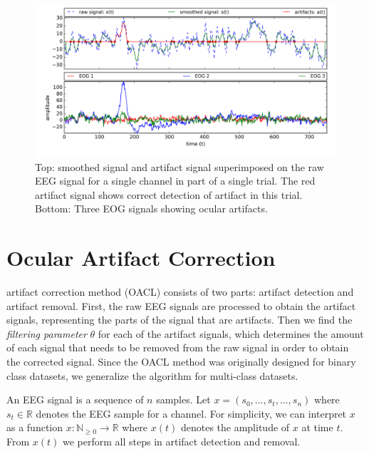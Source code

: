 \begin{figure}%
	\centering
	\includegraphics[width=1\textwidth]{figures/oacl-signals.png}
	\vspace{-2em}
	\caption{Top: smoothed signal and artifact signal superimposed on the raw EEG signal for a single channel in part of a single trial. The red artifact signal shows correct detection of artifact in this trial. Bottom: Three EOG signals showing ocular artifacts.}
	\label{fig:oacl-signals}
\end{figure}
\section{Ocular Artifact Correction}\label{sec:oacl}
\cite{li2015ocular} artifact correction method (OACL) consists of two parts: artifact detection and artifact removal. First, the raw EEG signals are processed to obtain the artifact signals, representing the parts of the signal that are artifacts. Then we find the \emph{filtering parameter} $\theta$ for each of the artifact signals, which determines the amount of each signal that needs to be removed from the raw signal in order to obtain the corrected signal. Since the OACL method was originally designed for binary class datasets, we generalize the algorithm for multi-class datasets.

An EEG signal is a sequence of $n$ samples. Let $x = (s_0,...,s_t,...,s_n)$ where $s_t \in \mathbb{R}$ denotes the EEG sample for a channel. For simplicity, we can interpret $x$ as a function $x : \mathbb{N}_{\geq 0} \rightarrow \mathbb{R}$ where $x(t)$ denotes the amplitude of $x$ at time $t$. From $x(t)$ we perform all steps in artifact detection and removal.


